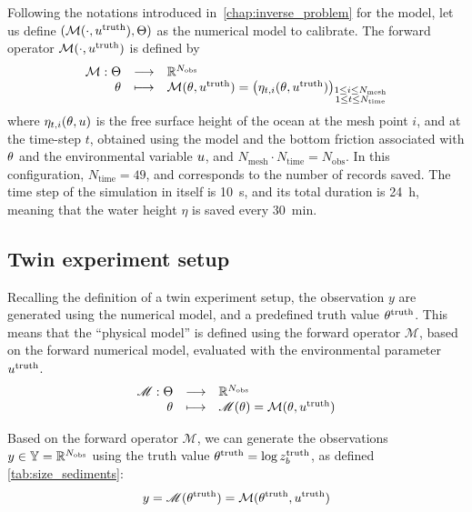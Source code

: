 \documentclass[../../Main_ManuscritThese.tex]{subfiles}
\newcommand{\zob}{z_b}
\begin{document}
Following the notations introduced in~\cref{chap:inverse_problem} for
the model, let us define
$(\mathcal{M}(\cdot,u^{\mathrm{truth}}),\Theta)$ as the numerical
model to calibrate. The forward operator $\mathcal{M}(\cdot, u^{\mathrm{truth}})$ is
defined by
\begin{equation}
  \begin{array}{rcl}
    \mathcal{M}: \Theta  &\longrightarrow& \mathbb{R}^{N_{\mathrm{obs}}} \\
    \theta & \longmapsto & \mathcal{M}(\theta, u^{\mathrm{truth}}) = \left(\eta_{t,i}(\theta, u^{\mathrm{truth}})\right)_{\substack{1 \leq i \leq N_{\mathrm{mesh}} \\ 1 \leq t \leq N_{\mathrm{time}}}} \\ 
  \end{array}
\end{equation}
where $\eta_{t,i}(\theta,u)$ is the free surface height of the ocean at
the mesh point $i$, and at the time-step $t$, obtained using the model
and the bottom friction associated with $\theta$ and the environmental
variable $u$, and
$N_{\mathrm{mesh}} \cdot N_{\mathrm{time}} = N_{\mathrm{obs}}$.  In
this configuration, $N_{\mathrm{time}} =\num{49}$, and corresponds to
the number of records saved. The time step of the simulation in itself
is \SI{10}{\second}, and its total duration is \SI{24}{\hour}, meaning that the
water height $\eta$ is saved every \SI{30}{\minute}.

\subsection{Twin experiment setup}
Recalling the definition of a twin experiment setup, the observation
$y$ are generated using the numerical model, and a predefined truth
value $\theta^{\mathrm{truth}}$.  This means that the ``physical model''
is defined using the forward operator $\mathscr{M}$, based on the
forward numerical model, evaluated with the environmental parameter
$u^{\mathrm{truth}}$.
\begin{equation}
  \label{eq:twin_exp}
  \begin{array}{rcl}
    \mathscr{M}: \Theta &\longrightarrow & \mathbb{R}^{N_{\mathrm{obs}}} \\
    \theta & \longmapsto &\mathscr{M}(\theta) = \mathcal{M}(\theta, u^{\mathrm{truth}})
  \end{array}
\end{equation}

Based on the forward operator $\mathscr{M}$, we can generate the
observations $y\in \mathbb{Y} = \mathbb{R}^{N_{\mathrm{obs}}}$ using the
truth value $\kk^{\mathrm{truth}}=\log \zob^{\mathrm{truth}}$, as
defined \cref{tab:size_sediments}:
\begin{equation}
  y = \mathscr{M}(\theta^{\mathrm{truth}}) = \mathcal{M}(\theta^{\mathrm{truth}}, u^{\mathrm{truth}})
\end{equation}
\end{document}

